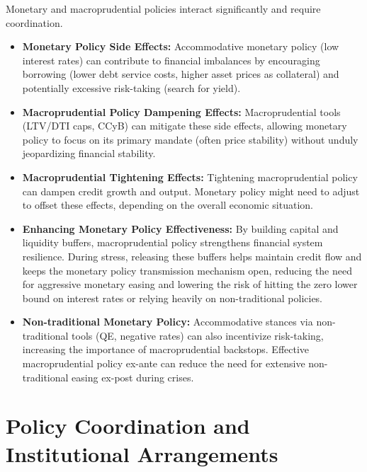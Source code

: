 Monetary and macroprudential policies interact significantly and require coordination.
\begin{itemize}
    \item \textbf{Monetary Policy Side Effects:} Accommodative monetary policy (low interest rates) can contribute to financial imbalances by encouraging borrowing (lower debt service costs, higher asset prices as collateral) and potentially excessive risk-taking (search for yield).
    \item \textbf{Macroprudential Policy Dampening Effects:} Macroprudential tools (LTV/DTI caps, CCyB) can mitigate these side effects, allowing monetary policy to focus on its primary mandate (often price stability) without unduly jeopardizing financial stability.
    \item \textbf{Macroprudential Tightening Effects:} Tightening macroprudential policy can dampen credit growth and output. Monetary policy might need to adjust to offset these effects, depending on the overall economic situation.
    \item \textbf{Enhancing Monetary Policy Effectiveness:} By building capital and liquidity buffers, macroprudential policy strengthens financial system resilience. During stress, releasing these buffers helps maintain credit flow and keeps the monetary policy transmission mechanism open, reducing the need for aggressive monetary easing and lowering the risk of hitting the zero lower bound on interest rates or relying heavily on non-traditional policies.
    \item \textbf{Non-traditional Monetary Policy:} Accommodative stances via non-traditional tools (QE, negative rates) can also incentivize risk-taking, increasing the importance of macroprudential backstops. Effective macroprudential policy ex-ante can reduce the need for extensive non-traditional easing ex-post during crises.
\end{itemize}

\section{Policy Coordination and Institutional Arrangements}

